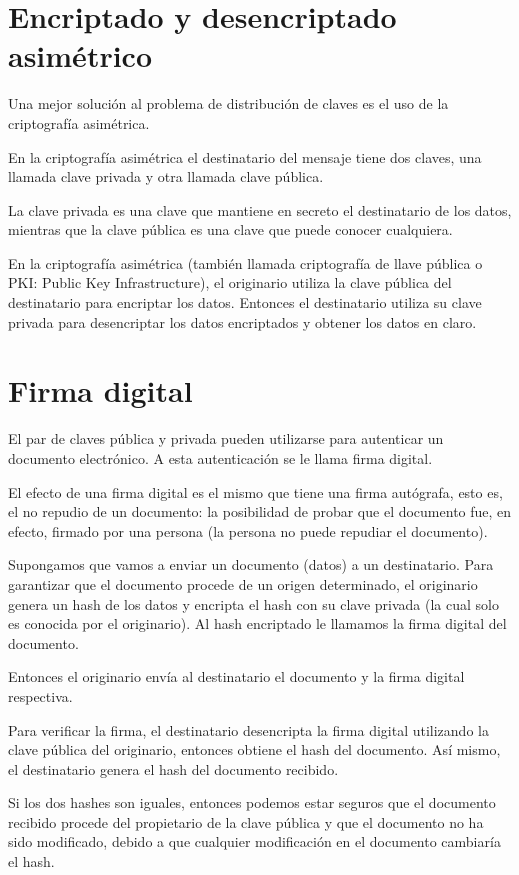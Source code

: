 \section{Encriptado y desencriptado asimétrico}

Una mejor solución al problema de distribución de claves es el uso de la criptografía asimétrica.

En la criptografía asimétrica el destinatario del mensaje tiene dos claves, una llamada clave privada y otra llamada clave pública.

La clave privada es una clave que mantiene en secreto el destinatario de los datos, mientras que la clave pública es una clave que puede conocer cualquiera.

En la criptografía asimétrica (también llamada criptografía de llave pública o PKI: Public Key Infrastructure), el originario utiliza la clave pública del destinatario para encriptar los datos. Entonces el destinatario utiliza su clave privada para desencriptar los datos encriptados y obtener los datos en claro.

\section{Firma digital}

El par de claves pública y privada pueden utilizarse para autenticar un documento electrónico. A esta autenticación se le llama firma digital.

El efecto de una firma digital es el mismo que tiene una firma autógrafa, esto es, el no repudio de un documento: la posibilidad de probar que el documento fue, en efecto, firmado por una persona (la persona no puede repudiar el documento).

Supongamos que vamos a enviar un documento (datos) a un destinatario. Para garantizar que el documento procede de un origen determinado, el originario genera un hash de los datos y encripta el hash con su clave privada (la cual solo es conocida por el originario). Al hash encriptado le llamamos la firma digital del documento.

Entonces el originario envía al destinatario el documento y la firma digital respectiva.

Para verificar la firma, el destinatario desencripta la firma digital utilizando la clave pública del originario, entonces obtiene el hash del documento. Así mismo, el destinatario genera el hash del documento recibido.

Si los dos hashes son iguales, entonces podemos estar seguros que el documento recibido procede del propietario de la clave pública y que el documento no ha sido modificado, debido a que cualquier modificación en el documento cambiaría el hash.

